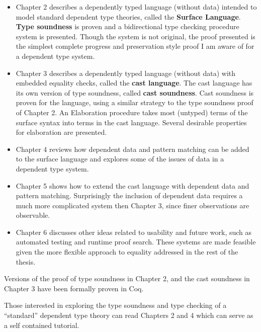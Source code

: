 \begin{itemize}
\item Chapter 2 describes a dependently typed language (without data) intended to model standard dependent type theories, called the \textbf{Surface Language}.
\textbf{Type soundness} is proven and a bidirectional type checking procedure system is presented.
Though the system is not original, the proof presented is the simplest complete progress and preservation style proof I am aware of for a dependent type system.   
\item Chapter 3 describes a dependently typed language (without data) with embedded equality checks, called the \textbf{cast language}.
The cast language has its own version of type soundness, called \textbf{cast soundness}.
Cast soundness is proven for the language, using a similar strategy to the type soundness proof of Chapter 2.
An Elaboration procedure takes most (untyped) terms of the surface syntax into terms in the cast language.
Several desirable properties for elaboration are presented. %
\item Chapter 4 reviews how dependent data and pattern matching can be added to the surface language and explores some of the issues of data in a dependent type system.
\item Chapter 5 shows how to extend the cast language with dependent data and pattern matching.
Surprisingly the inclusion of dependent data requires a much more complicated system then Chapter 3, since finer observations are observable.
\item Chapter 6 discusses other ideas related to usability and future work, such as automated testing and runtime proof search.
These systems are made feasible given the more flexible approach to equality addressed in the rest of the thesis.
\end{itemize}
Versions of the proof of type soundness in Chapter 2, and the cast soundness in Chapter 3 have been formally proven in Coq.

Those interested in exploring the type soundness and type checking of a ``standard'' dependent type theory can read Chapters 2 and 4 which can serve as a self contained tutorial.
